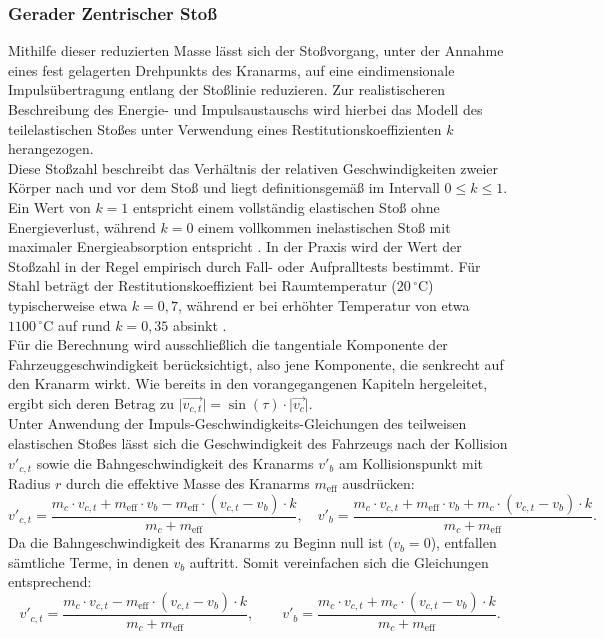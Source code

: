 \subsubsection{Gerader Zentrischer Stoß}
Mithilfe dieser reduzierten Masse lässt sich der Stoßvorgang, unter der Annahme eines fest gelagerten Drehpunkts des Kranarms, auf eine eindimensionale Impulsübertragung entlang der Stoßlinie reduzieren. Zur realistischeren Beschreibung des Energie- und Impulsaustauschs wird hierbei das Modell des teilelastischen Stoßes unter Verwendung eines Restitutionskoeffizienten $k$ herangezogen\parencite{kuchling_geschw-teilelastisch}.
\\
Diese Stoßzahl beschreibt das Verhältnis der relativen Geschwindigkeiten zweier Körper nach und vor dem Stoß und liegt definitionsgemäß im Intervall $0 \leq k \leq 1$. Ein Wert von $k = 1$ entspricht einem vollständig elastischen Stoß ohne Energieverlust, während $k = 0$ einem vollkommen inelastischen Stoß mit maximaler Energieabsorption entspricht \parencite{kuchling_geschw-teilelastisch}.
In der Praxis wird der Wert der Stoßzahl in der Regel empirisch durch Fall- oder Aufpralltests bestimmt\parencite{boege_stosszahl}. Für Stahl beträgt der Restitutionskoeffizient bei Raumtemperatur ($20\,^{\circ}\mathrm{C}$) typischerweise etwa $k = 0{,}7$, während er bei erhöhter Temperatur von etwa $1100\,^{\circ}\mathrm{C}$ auf rund $k = 0{,}35$ absinkt \parencite{boege_stosszahl}.
\\
Für die Berechnung wird ausschließlich die tangentiale Komponente der Fahrzeuggeschwindigkeit berücksichtigt, also jene Komponente, die senkrecht auf den Kranarm wirkt. Wie bereits in den vorangegangenen Kapiteln hergeleitet, ergibt sich deren Betrag zu $ \lvert\vec{v_{c,t}}\rvert = \sin(\tau) \cdot \lvert \vec{v_c} \rvert$.
\\
Unter Anwendung der Impuls-Geschwindigkeits-Gleichungen des teilweisen elastischen Stoßes\parencite{kuchling_geschw-teilelastisch} lässt sich die Geschwindigkeit des Fahrzeugs nach der Kollision $v'_{c,t}$ sowie die Bahngeschwindigkeit des Kranarms $v'_{b}$ am Kollisionspunkt mit Radius $r$ durch die effektive Masse des Kranarms $m_{\text{eff}}$ ausdrücken:
\[
v'_{c,t} = \frac{m_c \cdot v_{c,t} + m_{\text{eff}} \cdot v_b - m_{\text{eff}} \cdot (v_{c,t} - v_b) \cdot k}{m_c + m_{\text{eff}}},
\quad
v'_{b} = \frac{m_c \cdot v_{c,t} + m_{\text{eff}} \cdot v_b + m_c \cdot (v_{c,t} - v_b) \cdot k}{m_c + m_{\text{eff}}}.
\]
Da die Bahngeschwindigkeit des Kranarms zu Beginn null ist ($v_b = 0$), entfallen sämtliche Terme, in denen $v_b$ auftritt. Somit vereinfachen sich die Gleichungen entsprechend:
\[
v'_{c,t} = \frac{m_c \cdot v_{c,t} - m_{\text{eff}} \cdot (v_{c,t} - v_b) \cdot k}{m_c + m_{\text{eff}}},
\qquad
v'_{b} = \frac{m_c \cdot v_{c,t} + m_c \cdot (v_{c,t} - v_b) \cdot k}{m_c + m_{\text{eff}}}.
\]

